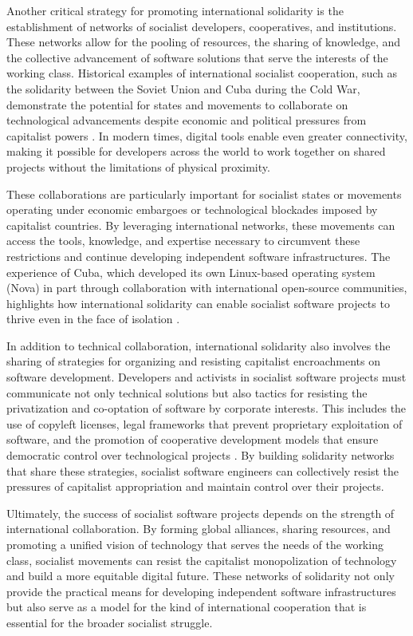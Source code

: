 \begin{refsection}
Another critical strategy for promoting international solidarity is the establishment of networks of socialist developers, cooperatives, and institutions. These networks allow for the pooling of resources, the sharing of knowledge, and the collective advancement of software solutions that serve the interests of the working class. Historical examples of international socialist cooperation, such as the solidarity between the Soviet Union and Cuba during the Cold War, demonstrate the potential for states and movements to collaborate on technological advancements despite economic and political pressures from capitalist powers \cite[pp.~90-93]{ernesto1968}. In modern times, digital tools enable even greater connectivity, making it possible for developers across the world to work together on shared projects without the limitations of physical proximity.

These collaborations are particularly important for socialist states or movements operating under economic embargoes or technological blockades imposed by capitalist countries. By leveraging international networks, these movements can access the tools, knowledge, and expertise necessary to circumvent these restrictions and continue developing independent software infrastructures. The experience of Cuba, which developed its own Linux-based operating system (Nova) in part through collaboration with international open-source communities, highlights how international solidarity can enable socialist software projects to thrive even in the face of isolation \cite[pp.~73-75]{raymond2022}.

In addition to technical collaboration, international solidarity also involves the sharing of strategies for organizing and resisting capitalist encroachments on software development. Developers and activists in socialist software projects must communicate not only technical solutions but also tactics for resisting the privatization and co-optation of software by corporate interests. This includes the use of copyleft licenses, legal frameworks that prevent proprietary exploitation of software, and the promotion of cooperative development models that ensure democratic control over technological projects \cite[pp.~12-15]{moglen2003}. By building solidarity networks that share these strategies, socialist software engineers can collectively resist the pressures of capitalist appropriation and maintain control over their projects.

Ultimately, the success of socialist software projects depends on the strength of international collaboration. By forming global alliances, sharing resources, and promoting a unified vision of technology that serves the needs of the working class, socialist movements can resist the capitalist monopolization of technology and build a more equitable digital future. These networks of solidarity not only provide the practical means for developing independent software infrastructures but also serve as a model for the kind of international cooperation that is essential for the broader socialist struggle.


\end{refsection}
